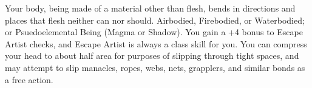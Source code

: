 \shortdescfeat
{Your body, being made of a material other than flesh, bends in directions and places that flesh neither can  nor should.}
{Airbodied, Firebodied, or Waterbodied; or Psuedoelemental Being (Magma or Shadow).}
{You gain a +4 bonus to Escape Artist checks, and Escape Artist is always a class skill for you.  You can compress your head to about half area for purposes of slipping through tight spaces, and may attempt to slip manacles, ropes, webs, nets, grapplers, and similar bonds as a free action.}


